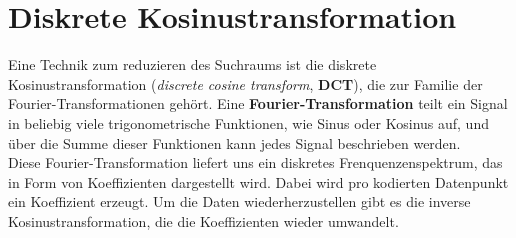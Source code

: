 \newpage

    \section{Diskrete Kosinustransformation} \label{dct-definition}

        Eine Technik zum reduzieren des Suchraums ist die diskrete Kosinustransformation (\textit{discrete cosine transform}, \textbf{DCT}), die zur Familie der Fourier-Transformationen gehört. Eine \textbf{Fourier-Transformation} teilt ein Signal in beliebig viele trigonometrische Funktionen, wie Sinus oder Kosinus auf, und über die Summe dieser Funktionen kann jedes Signal beschrieben werden. \\

        \noindent
        Diese Fourier-Transformation liefert uns ein diskretes Frenquenzenspektrum, das in Form von Koeffizienten dargestellt wird. Dabei wird pro kodierten Datenpunkt ein Koeffizient erzeugt. Um die Daten wiederherzustellen gibt es die inverse Kosinustransformation, die die Koeffizienten wieder umwandelt.

